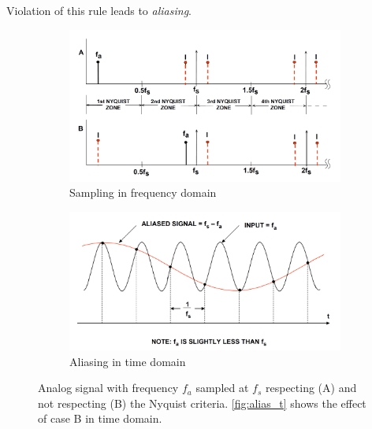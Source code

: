 Violation of this rule leads to \textit{aliasing}.


\begin{figure}[tbh]
	\centering
	\begin{subfigure}{\textwidth}
		\centering
		\includegraphics[width=\linewidth]{chap/02-theory/img/alias_f}  
		\caption{Sampling in frequency domain}
		\label{fig:alias_f}
	\end{subfigure}
	\begin{subfigure}{\textwidth}
		\centering
		\includegraphics[width=\linewidth]{chap/02-theory/img/alias_t}  
		\caption{Aliasing in time domain}
		\label{fig:alias_t}
	\end{subfigure}
	\caption[Aliasing]{Analog signal with frequency $f_a$ sampled at $f_s$ respecting (A) and not respecting (B) the Nyquist criteria. \autoref{fig:alias_t} shows the effect of case B in time domain. \cite{walt}}
\end{figure}



